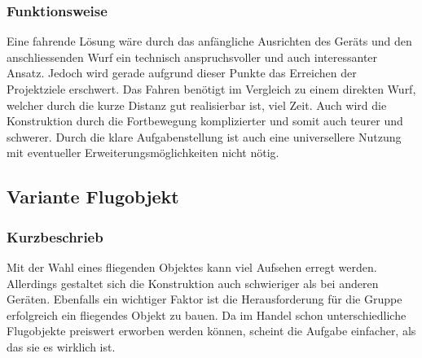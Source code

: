 \subsubsection{Funktionsweise}
Eine fahrende Lösung wäre durch das anfängliche Ausrichten des Geräts und 
den anschliessenden Wurf ein technisch anspruchsvoller und auch interessanter 
Ansatz. Jedoch wird gerade aufgrund dieser Punkte das Erreichen der 
Projektziele erschwert. Das Fahren benötigt im Vergleich zu einem direkten 
Wurf, welcher durch die kurze Distanz gut realisierbar ist, viel Zeit. Auch 
wird die Konstruktion durch die Fortbewegung komplizierter und somit auch 
teurer und schwerer. Durch die klare Aufgabenstellung ist auch eine 
universellere Nutzung mit eventueller Erweiterungsmöglichkeiten nicht nötig. 



\clearpage

\subsection{Variante Flugobjekt}
\subsubsection{Kurzbeschrieb}
Mit der Wahl eines fliegenden Objektes kann viel Aufsehen erregt werden. 
Allerdings gestaltet sich die Konstruktion auch schwieriger als bei anderen 
Geräten. Ebenfalls ein wichtiger Faktor ist die Herausforderung für die Gruppe 
erfolgreich ein fliegendes Objekt zu bauen. Da im Handel schon 
unterschiedliche Flugobjekte preiswert erworben werden können, scheint die 
Aufgabe einfacher, als das sie es wirklich ist.

